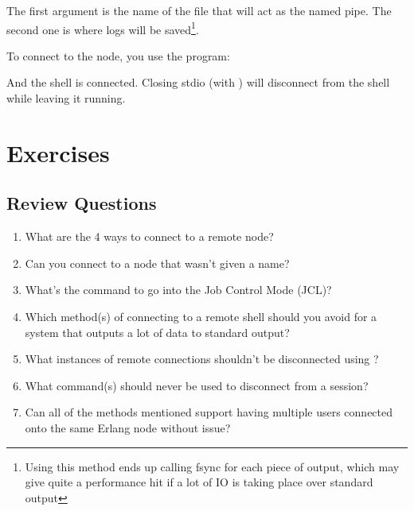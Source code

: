 The first argument is the name of the file that will act as the named pipe. The second one is where logs will be saved\footnote{Using this method ends up calling fsync for each piece of output, which may give quite a performance hit if a lot of IO is taking place over standard output}.

To connect to the node, you use the  program:


And the shell is connected. Closing stdio (with ) will disconnect from the shell while leaving it running.


\section{Exercises}

\subsection*{Review Questions}

\begin{enumerate}
	\item What are the 4 ways to connect to a remote node?
	\item Can you connect to a node that wasn't given a name?
	\item What's the command to go into the Job Control Mode (JCL)?
	\item Which method(s) of connecting to a remote shell should you avoid for a system that outputs a lot of data to standard output?
	\item What instances of remote connections shouldn't be disconnected using ?
	\item What command(s) should never be used to disconnect from a session?
	\item Can all of the methods mentioned support having multiple users connected onto the same Erlang node without issue?
\end{enumerate}

